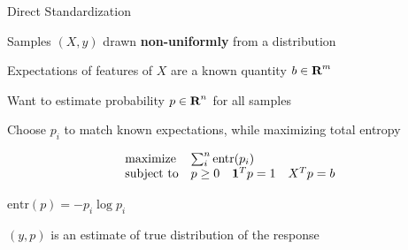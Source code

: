 \documentclass{beamer}
\begin{document}

\begin{frame}{Direct Standardization}
	\BIT
		\item Samples $(X,y)$ drawn \textbf{non-uniformly} from a distribution
		\item Expectations of features of $X$ are a known quantity $b \in {\mbox{\bf R}}^m$
		\item Want to estimate probability $p \in {\mbox{\bf R}}^n$ for all samples
		\item Choose $p_i$ to match known expectations, while maximizing total entropy
	\EIT
	
	\pause
	\[
	\begin{array}{ll} \mbox{maximize} & \sum_i^n \mbox{entr}(p_i) \\
	\mbox{subject to} & p \geq 0 \quad \mathbf 1^Tp = 1 \quad X^Tp = b
	\end{array}
	\]
	
	\BIT
	\item $\mbox{entr}(p) = -p_i \log p_i$
	\item $(y,p)$ is an estimate of true distribution of the response
	\EIT
\end{frame}
\end{document}
